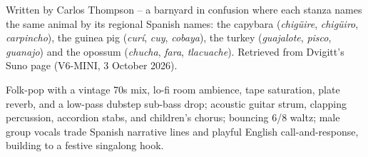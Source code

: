 
\begin{notes}
Written by Carlos Thompson -- a barnyard in confusion where each stanza names the same animal by its regional Spanish names: the capybara (\emph{chigüire}, \emph{chigüiro}, \emph{carpincho}), the guinea pig (\emph{curí}, \emph{cuy}, \emph{cobaya}), the turkey (\emph{guajalote}, \emph{pisco}, \emph{guanajo}) and the opossum (\emph{chucha}, \emph{fara}, \emph{tlacuache}). Retrieved from Dvigitt's Suno page (V6-MINI, 3 October 2026).
\end{notes}
\begin{style}
Folk-pop with a vintage 70s mix, lo-fi room ambience, tape saturation, plate reverb, and a low-pass dubstep sub-bass drop; acoustic guitar strum, clapping percussion, accordion stabs, and children’s chorus; bouncing 6/8 waltz; male group vocals trade Spanish narrative lines and playful English call-and-response, building to a festive singalong hook.
\end{style}
